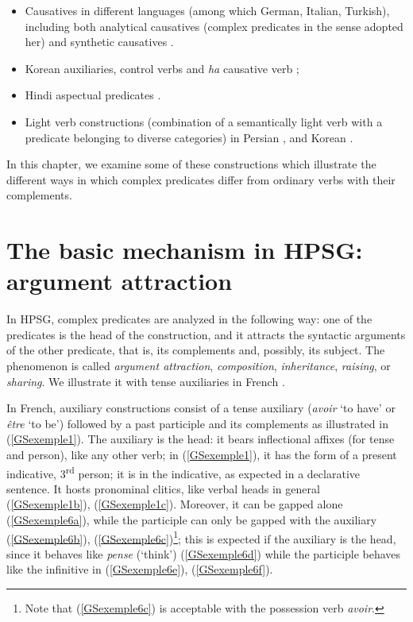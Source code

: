 \documentclass[output=paper
	        ,collection
	        ,collectionchapter
 	        ,biblatex
                ,babelshorthands
                ,newtxmath
                ,draftmode
                ,colorlinks, citecolor=brown
]{langscibook}
\begin{document}
{\begin{itemize}
	\item Causatives in different languages (among which German, Italian, Turkish), including both analytical causatives (complex predicates in the sense adopted her) and synthetic causatives \citep{Webelhuth98a-u}. 
	
	\item Korean auxiliaries, control verbs and \emph{ha} causative verb \citep{Chung98a-u, Sells1991, Yoo2003, Kim2016a-u};
	
	\item Hindi aspectual predicates \citep{poornima2009hindi}. 
	
	\item Light verb constructions (combination of a semantically light verb with a predicate belonging to diverse categories) in Persian \citep{bonami2010persian, MuellerPersian-unlinked, pollet2012grammaire, bonami2015diversity}, and Korean \citep{Ryu:93, lee2001argument, choi2001mixed, Kim2016a-u}.  
	
\end{itemize}


In this chapter, we examine some of these constructions which illustrate the different ways in which complex predicates differ from ordinary verbs with their complements.


\section{The basic mechanism in HPSG: argument attraction}\label{GSsection2}

In HPSG, complex predicates are analyzed in the following way: one of the predicates is the head of the construction, and it attracts the syntactic arguments of the other predicate, that is, its complements and, possibly, its subject. The phenomenon is called \emph{argument attraction}, \emph{composition}, \emph{inheritance}, \emph{raising}, or \emph{sharing}. We illustrate it with tense auxiliaries in French \citep{abeille1994complementation, AG2002b-u}.

In French, auxiliary constructions consist of a tense auxiliary (\emph{avoir} `to have' or \emph{\^etre} `to be') followed by a past participle and its complements as illustrated in (\ref{GSexemple1}). The auxiliary is the head: it bears inflectional affixes (for tense and person), like any other verb; in (\ref{GSexemple1}), it has the form of a present indicative, 3\textsuperscript{rd} person; it is in the indicative, as expected in a declarative sentence. It hosts pronominal clitics, like verbal heads in general (\ref{GSexemple1b}), (\ref{GSexemple1c}). Moreover, it can be gapped alone (\ref{GSexemple6a}), while the participle can only be gapped with the auxiliary (\ref{GSexemple6b}), (\ref{GSexemple6c})\footnote{Note that (\ref{GSexemple6c}) is acceptable with the possession verb \emph{avoir}.}; this is expected if the auxiliary is the head, since it behaves like \emph{pense} (`think') (\ref{GSexemple6d}) while the participle behaves like the infinitive in (\ref{GSexemple6e}), (\ref{GSexemple6f}). 

}
\end{document}
